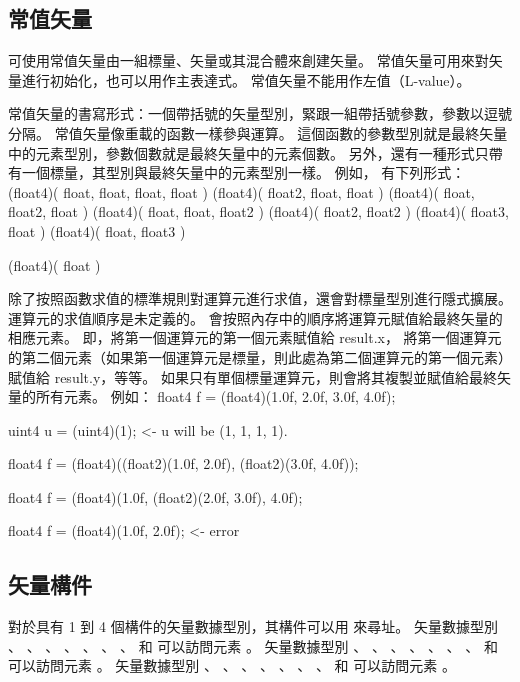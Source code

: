 \subsection{常值矢量}

可使用常值矢量由一組標量、矢量或其混合體來創建矢量。
常值矢量可用來對矢量進行初始化，也可以用作主表達式。
常值矢量不能用作左值（L-value）。

常值矢量的書寫形式：一個帶括號的矢量型別，緊跟一組帶括號參數，參數以逗號分隔。
常值矢量像重載的函數一樣參與運算。
這個函數的參數型別就是最終矢量中的元素型別，參數個數就是最終矢量中的元素個數。
另外，還有一種形式只帶有一個標量，其型別與最終矢量中的元素型別一樣。
例如，  有下列形式：
\startclc
(float4)( float, float, float, float )
(float4)( float2, float, float )
(float4)( float, float2, float )
(float4)( float, float, float2 )
(float4)( float2, float2 )
(float4)( float3, float )
(float4)( float, float3 )

(float4)( float )
\stopclc

除了按照函數求值的標準規則對運算元進行求值，還會對標量型別進行隱式擴展。
運算元的求值順序是未定義的。
會按照內存中的順序將運算元賦值給最終矢量的相應元素。
即，將第一個運算元的第一個元素賦值給 result.x，
將第一個運算元的第二個元素（如果第一個運算元是標量，則此處為第二個運算元的第一個元素）
賦值給 result.y，等等。
如果只有單個標量運算元，則會將其複製並賦值給最終矢量的所有元素。
例如：
\startclc
float4	f = (float4)(1.0f, 2.0f, 3.0f, 4.0f);

uint4	u = (uint4)(1);		<- u will be (1, 1, 1, 1).

float4	f = (float4)((float2)(1.0f, 2.0f),
		     (float2)(3.0f, 4.0f));

float4	f = (float4)(1.0f, (float2)(2.0f, 3.0f), 4.0f);

float4	f = (float4)(1.0f, 2.0f);	<- error
\stopclc

\subsection{矢量構件}

對於具有 1 到 4 個構件的矢量數據型別，其構件可以用  來尋址。
矢量數據型別 、 、 、 、
 、 、 、  和 
 可以訪問元素 。
矢量數據型別 、 、 、 、
 、 、 、  和 
 可以訪問元素 。
矢量數據型別 、 、 、 、
 、 、 、  和 
 可以訪問元素 。

